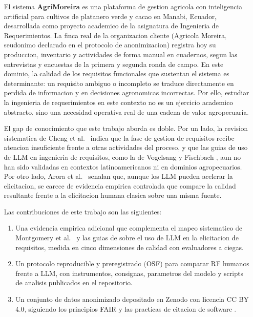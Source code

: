 \documentclass[11pt,a4paper]{article}
\begin{document}
El sistema \textbf{AgriMoreira} es una plataforma de gestion agricola con
inteligencia artificial para cultivos de platanero verde y cacao en Manabi,
Ecuador, desarrollada como proyecto academico de la asignatura de Ingenieria
de Requerimientos. La finca real de la organizacion cliente (Agricola
Moreira, seudonimo declarado en el protocolo de anonimizacion) registra hoy
su produccion, inventario y actividades de forma manual en cuadernos, segun
las entrevistas y encuestas de la primera y segunda ronda de campo. En este
dominio, la calidad de los requisitos funcionales que sustentan el sistema es
determinante: un requisito ambiguo o incompleto se traduce directamente en
perdida de informacion y en decisiones agronomicas incorrectas. Por ello,
estudiar la ingenieria de requerimientos en este contexto no es un ejercicio
academico abstracto, sino una necesidad operativa real de una cadena de valor
agropecuaria.

El gap de conocimiento que este trabajo aborda es doble. Por un lado, la
revision sistematica de Cheng et al.\ \cite{cheng2026} indica que la fase de
gestion de requisitos recibe atencion insuficiente frente a otras actividades
del proceso, y que las guias de uso de LLM en ingenieria de requisitos, como
la de Vogelsang y Fischbach \cite{vogelsang2024}, aun no han sido validadas en
contextos latinoamericanos ni en dominios agropecuarios. Por otro lado,
Arora et al.\ \cite{arora2024} senalan que, aunque los LLM pueden acelerar la
elicitacion, se carece de evidencia empirica controlada que compare la calidad
resultante frente a la elicitacion humana clasica sobre una misma fuente.

Las contribuciones de este trabajo son las siguientes:
\begin{enumerate}
    \item Una evidencia empirica adicional que complementa el mapeo
    sistematico de Montgomery et al.\ \cite{montgomery2022} y las guias de
    \cite{vogelsang2024} sobre el uso de LLM en la elicitacion de requisitos,
    medida en cinco dimensiones de calidad con evaluadores a ciegas.
    \item Un protocolo reproducible y preregistrado (OSF) para comparar RF
    humanos frente a LLM, con instrumentos, consignas, parametros del modelo y
    scripts de analisis publicados en el repositorio.
    \item Un conjunto de datos anonimizado depositado en Zenodo con licencia
    CC BY 4.0, siguiendo los principios FAIR \cite{wilkinson2016} y las
    practicas de citacion de software \cite{smith2016,druskat2021}.
\end{enumerate}
\end{document}
